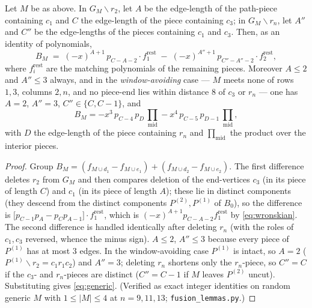 \begin{lemma}\label{lem:master}
Let $M$ be as above.  In $G_M\smallsetminus r_2$, let $A$ be the edge-length
of the path-piece containing $c_1$ and $C$ the edge-length of the piece
containing $c_3$; in $G_M\smallsetminus r_n$, let $A''$ and $C''$ be the
edge-lengths of the pieces containing $c_1$ and $c_3$.  Then, as an
identity of polynomials,
\begin{equation}\label{eq:master}
B_M\;=\;(-x)^{A+1}\,p_{C-A-2}\cdot f^{\mathrm{rest}}_1
\;-\;(-x)^{A''+1}\,p_{C''-A''-2}\cdot f^{\mathrm{rest}}_2 ,
\end{equation}
where $f^{\mathrm{rest}}_i$ are the matching polynomials of the remaining
pieces.  Moreover $A\le 2$ and $A''\le3$ always, and in the
\emph{window-avoiding} case --- $M$ meets none of rows $1,3$, columns
$2,n$, and no piece-end lies within distance $8$ of $c_3$ or $r_n$ ---
one has $A=2$, $A''=3$, $C''\in\{C,C-1\}$, and
\begin{equation}\label{eq:generic}
B_M=-x^3\,p_{C-4}\,p_D\,\textstyle\prod_{\mathrm{mid}}
-x^4\,p_{C-5}\,p_{D-1}\,\prod_{\mathrm{mid}},
\end{equation}
with $D$ the edge-length of the piece containing $r_n$ and
$\prod_{\mathrm{mid}}$ the product over the interior pieces.
\end{lemma}

\begin{proof}
Group $B_M=(f_{M\cup d_1}-f_{M\cup e_1})+(f_{M\cup d_2}-f_{M\cup e_2})$.
The first difference deletes $r_2$ from $G_M$ and then compares deletion
of the end-vertices $c_3$ (in its piece of length $C$) and $c_1$ (in its
piece of length $A$); these lie in distinct components (they descend from
the distinct components $P^{(2)},P^{(1)}$ of $B_0$), so the difference is
$\bigl[p_{C-1}p_A-p_Cp_{A-1}\bigr]\cdot f^{\mathrm{rest}}_1$, which is
$(-x)^{A+1}p_{C-A-2}f^{\mathrm{rest}}_1$ by \eqref{eq:wronskian}.  The
second difference is handled identically after deleting $r_n$ (with the
roles of $c_1,c_3$ reversed, whence the minus sign).  $A\le2$, $A''\le3$
because every piece of $P^{(1)}$ has at most $3$ edges.  In the
window-avoiding case $P^{(1)}$ is intact, so $A=2$ ($P^{(1)}\smallsetminus
r_2=c_1r_1c_2$) and $A''=3$; deleting $r_n$ shortens only the
$r_n$-piece, so $C''=C$ if the $c_3$- and $r_n$-pieces are distinct
($C''=C-1$ if $M$ leaves $P^{(2)}$ uncut).  Substituting gives
\eqref{eq:generic}.  (Verified as exact integer identities on random
generic $M$ with $1\le|M|\le4$ at $n=9,11,13$;
\texttt{fusion\_lemmas.py}.)
\end{proof}

